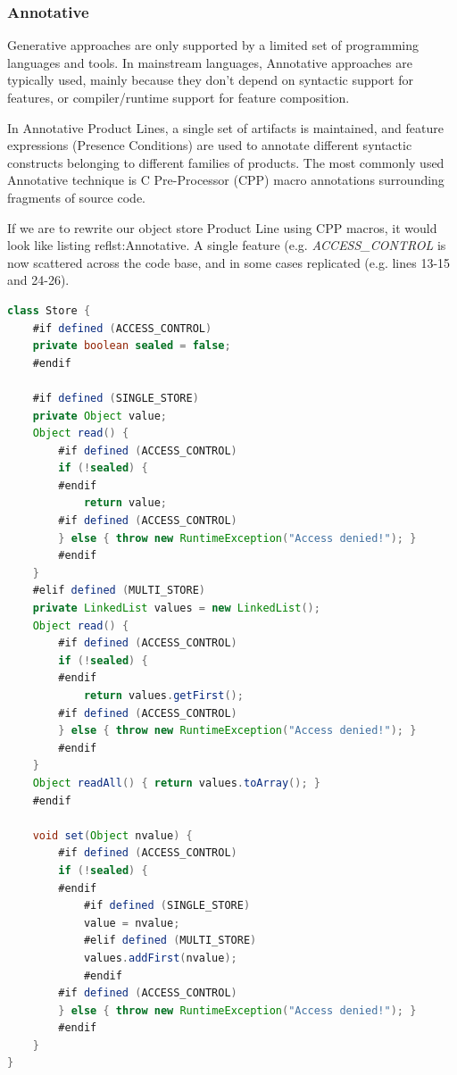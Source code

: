 \documentclass[11pt]{article}
\begin{document}
\subsubsection{Annotative}

Generative approaches are only supported by a limited set of programming languages and tools. In mainstream languages, Annotative approaches are typically used, mainly because they don't depend on syntactic support for features, or compiler/runtime support for feature composition.

In Annotative Product Lines, a single set of artifacts is maintained, and feature expressions (Presence Conditions) are used to annotate different syntactic constructs belonging to different families of products. The most commonly used Annotative technique is C Pre-Processor (CPP) macro annotations surrounding fragments of source code.

If we are to rewrite our object store Product Line using CPP macros, it would look like listing 
ref{lst:Annotative}. A single feature (e.g. \emph{ACCESS\_CONTROL} is now scattered across the code base, and in some cases replicated (e.g. lines 13-15 and 24-26).
  

\begin{lstlisting}[language=Java, caption=Annotative example, label={lst:Annotative}]
class Store {
	#if defined (ACCESS_CONTROL)
	private boolean sealed = false;
	#endif

	#if defined (SINGLE_STORE)
	private Object value;
	Object read() {
		#if defined (ACCESS_CONTROL)
 		if (!sealed) {
		#endif
			return value;
		#if defined (ACCESS_CONTROL)
		} else { throw new RuntimeException("Access denied!"); }
		#endif 
	}
	#elif defined (MULTI_STORE)
	private LinkedList values = new LinkedList();
	Object read() { 
		#if defined (ACCESS_CONTROL)
 		if (!sealed) {
		#endif
			return values.getFirst(); 
		#if defined (ACCESS_CONTROL)
		} else { throw new RuntimeException("Access denied!"); }
		#endif
	}
	Object readAll() { return values.toArray(); }
	#endif
	
	void set(Object nvalue) {
		#if defined (ACCESS_CONTROL)
 		if (!sealed) {
		#endif
			#if defined (SINGLE_STORE)
			value = nvalue;
			#elif defined (MULTI_STORE)
			values.addFirst(nvalue);
			#endif
		#if defined (ACCESS_CONTROL)
		} else { throw new RuntimeException("Access denied!"); }
		#endif
	}
}
\end{lstlisting}
\end{document}
